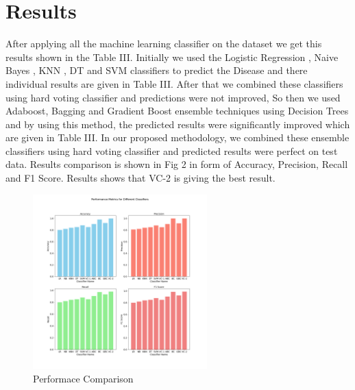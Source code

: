 \documentclass[journal, twoside, final]{IEEEtran}
\begin{document}
\section{Results}
After applying all the machine learning classifier on the dataset we get this results shown in the Table III.
Initially we used the Logistic Regression , Naive Bayes , KNN , DT and SVM classifiers to predict the Disease and there individual results are given in Table III. After that we combined these classifiers using hard voting classifier and predictions were not improved, So then we used Adaboost, Bagging and Gradient Boost ensemble techniques using Decision Trees and by using this method, the predicted results were significantly improved which are given in Table III. In our proposed methodology, we combined these ensemble classifiers using hard voting classifier and predicted results were perfect on test data. Results comparison is shown in Fig 2 in form of Accuracy, Precision, Recall and F1 Score. Results shows that VC-2 is giving the best result.
\begin{figure}[htbp]
  \centering
  \includegraphics[width=0.6\textwidth]{performance_metrics.png} %
  \captionsetup{justification=centering}
  \caption{Performace Comparison}
\end{figure}
\end{document}
